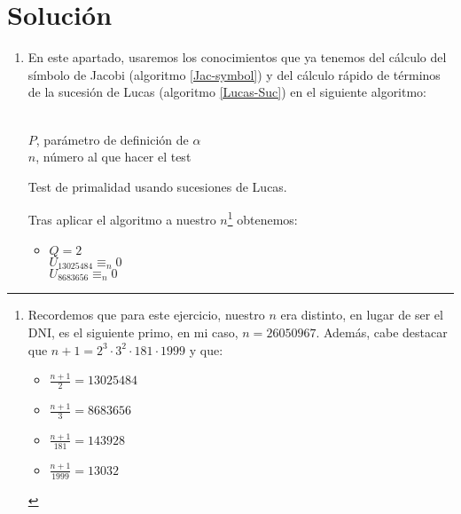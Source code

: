 \section*{Solución}
	\begin{enumerate}
		\item En este apartado, usaremos los conocimientos que ya tenemos del cálculo del símbolo de Jacobi (algoritmo
		\ref{Jac-symbol}) y del cálculo rápido de términos de la sucesión de Lucas (algoritmo \ref{Lucas-Suc}) en el
		siguiente algoritmo:
		
		\begin{algorithm}[H]
		\begin{algorithmic}[1]
			\REQUIRE \ \\
				\texttt{$P$}, parámetro de definición de $\alpha$ \\
				\texttt{$n$}, número al que hacer el test \\
				\ELSE
						\ENDIF
					\ENDFOR
				\ENDIF
					\ENDFOR
				\ELSE
				\ENDIF
			\ENDWHILE
			\ENDIF
		\end{algorithmic}
		\caption{Test de primalidad usando sucesiones de Lucas.}
		\label{Primarity}
		\end{algorithm}
		
		Tras aplicar el algoritmo a nuestro $n$\footnote{Recordemos que para este ejercicio, nuestro $n$ era
		distinto, en lugar de ser el DNI, es el siguiente primo, en mi caso, $n = 26050967$. Además, cabe destacar
		que $n+1 = 2^3 \cdot 3^2 \cdot 181 \cdot 1999$ y que:
		\begin{itemize}
			\item $\displaystyle \frac{n+1}{2} = 13025484$
			\item $\displaystyle \frac{n+1}{3} = 8683656$
			\item $\displaystyle \frac{n+1}{181} = 143928$
			\item $\displaystyle \frac{n+1}{1999} = 13032$
		\end{itemize}} obtenemos:
		\begin{itemize}
			\item $Q = 2$ \\
			$U_{13025484} \equiv_n 0$ \\
			$U_{8683656} \equiv_n 0$
			

\end{itemize}
\end{enumerate}

